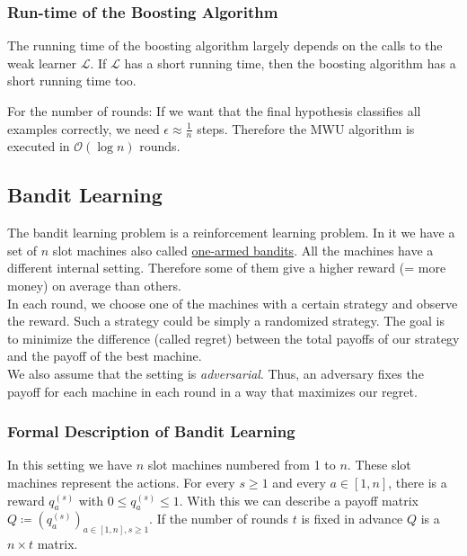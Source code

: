 \documentclass[english]{panikzettel}
\begin{document}
\subsubsection{Run-time of the Boosting Algorithm}
The running time of the boosting algorithm largely depends on the calls to the weak learner $\mathcal{L}$. If $\mathcal{L}$ has a short running time, then the boosting algorithm has a short running time too.

For the number of rounds: If we want that the final hypothesis classifies all examples correctly, we need $\epsilon\approx\frac{1}{n}$ steps. Therefore the MWU algorithm is executed in $\mathcal{O}(\log n)$ rounds.

\subsection{Bandit Learning}
The bandit learning problem is a reinforcement learning problem.
In it we have a set of $n$ slot machines also called \href{https://en.wikipedia.org/wiki/Slot_machine}{one-armed bandits}.
All the machines have a different internal setting.
Therefore some of them give a higher reward (= more money) on average than others.\\
In each round, we choose one of the machines with a certain strategy and observe the reward.
Such a strategy could be simply a randomized strategy.
The goal is to minimize the difference (called regret) between the total payoffs of our strategy and the payoff of the best machine.\\
We also assume that the setting is \emph{adversarial}.
Thus, an adversary fixes the payoff for each machine in each round in a way that maximizes our regret.

\subsubsection{Formal Description of Bandit Learning}
In this setting we have $n$ slot machines numbered from 1 to $n$. These slot machines represent the actions. For every $s\geq 1$ and every $a\in [1,n]$, there is a reward $q_a^{(s)}$ with $0\leq q_a^{(s)} \leq 1$.
With this we can describe a payoff matrix $Q\coloneqq (q_a^{(s)})_{a\in[1,n], s\geq 1}$. If the number of rounds $t$ is fixed in advance $Q$ is a $n\times t$ matrix.
\end{document}
